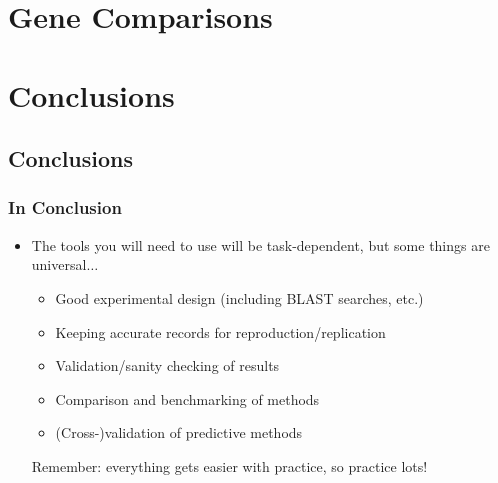 %  

\section{Gene Comparisons}
  


\section{Conclusions}
  \subsection{Conclusions}
\begin{frame}[fragile]
  \frametitle{In Conclusion}
  \begin{itemize}
    \item The tools you will need to use will be task-dependent, but some things are universal$\ldots$
    \begin{itemize}
      \item Good experimental design (including BLAST searches, etc.)
      \item Keeping accurate records for reproduction/replication
      \item Validation/sanity checking of results
      \item Comparison and benchmarking of methods
      \item (Cross-)validation of predictive methods
    \end{itemize}
     Remember: everything gets easier with practice, so practice lots!   
  \end{itemize}
\end{frame}



